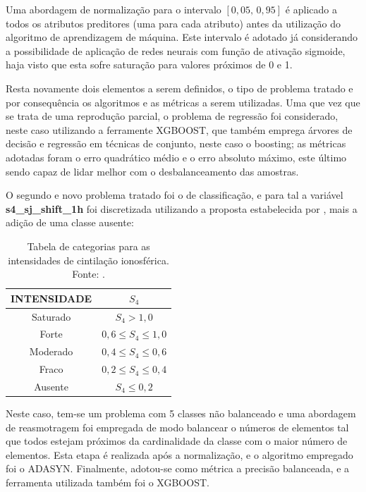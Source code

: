 Uma abordagem de normalização para o intervalo $[0,05,\,0,95]$ é aplicado a todos os atributos preditores (uma para cada atributo) antes da utilização do algoritmo de aprendizagem de máquina. Este intervalo é adotado já considerando a possibilidade de aplicação de redes neurais com função de ativação sigmoide, haja visto que esta sofre saturação para valores próximos de 0 e 1.

Resta novamente dois elementos a serem definidos, o tipo de problema tratado e por consequência os algoritmos e as métricas a serem utilizadas. Uma que vez que se trata de uma reprodução parcial, o problema de regressão foi considerado, neste caso utilizando a ferramente XGBOOST, que também emprega árvores de decisão e regressão em técnicas de conjunto, neste caso o boosting; as métricas adotadas foram o erro quadrático médio e o erro absoluto máximo, este último sendo capaz de lidar melhor com o desbalanceamento das amostras.

O segundo e novo problema tratado foi o de classificação, e para tal a variável {\bf s4\_sj\_shift\_1h} foi discretizada utilizando a proposta estabelecida por \cite{MUELLA:2008}, mais a adição de uma classe ausente:

\begin{table}[H]
\begin{center}
\begin{tabular}{|c|c|}
\hline
{\bf INTENSIDADE} & {\bf $S_4$} \\ \hline
Saturado          & $S_4 > 1,0$ \\ \hline
Forte             & $0,6 \le S_4 \le 1,0$ \\ \hline
Moderado          & $0,4 \le S_4 \le 0,6$ \\ \hline
Fraco             & $0,2 \le S_4 \le 0,4$ \\ \hline
Ausente           & $ S_4 \le 0,2 $ \\ \hline
\end{tabular}
\end{center}
\caption{Tabela de categorias para as intensidades de cintilação ionosférica. Fonte: \cite{MUELLA:2008}.}
\label{tab:class4}
\end{table}

Neste caso, tem-se um problema com 5 classes não balanceado e uma abordagem de reasmotragem foi empregada de modo balancear o números de elementos tal que todos estejam próximos da cardinalidade da classe com o maior número de elementos. Esta etapa é realizada após a normalização, e o algoritmo empregado foi o ADASYN. Finalmente, adotou-se como métrica a precisão balanceada, e a ferramenta utilizada também foi o XGBOOST.

